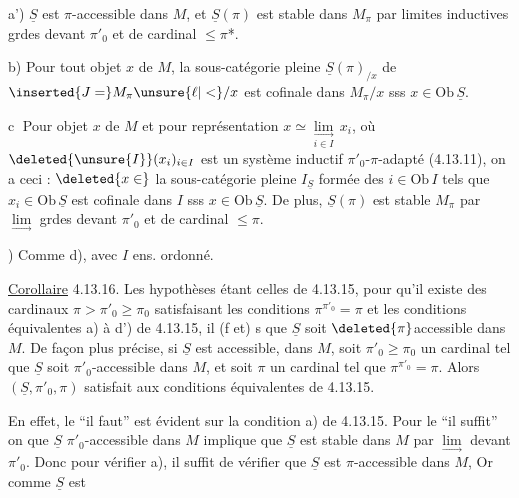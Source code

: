 a') $\underline S$ est $\pi$-accessible dans $M$, et $\underline S(\pi)$ est stable dans $M_\pi$ par limites inductives grdes devant $\pi'_0$ et de cardinal $\leq\pi$*.


b) Pour tout objet $x$ de $M$,  la sous-catégorie  pleine $\underline S(\pi)_{/x}$ de $\inserted{J=}M_{\pi}\unsure{\ell|<}/x$ est cofinale dans $M_\pi/x$ sss $x\in\mathrm{Ob}\,\underline S$. 

\textcircled{c} Pour  objet $x$ de $M$ et pour  représentation $x\simeq\underset{i\in I}{\underset{\longrightarrow}{\lim}}\,x_i$, où $\deleted{\unsure{I}}(x_i)_{i\in I}$ est un système inductif $\pi'_0$-$\pi$-adapté (4.13.11), on a ceci : $\deleted{x\in}$ la sous-catégorie  pleine $I_{\underline S}$  formée des $i\in\mathrm{Ob}\,I$ tels que $x_i\in\mathrm{Ob}\,\underline S$ est cofinale dans $I$ sss $x\in\mathrm{Ob}\,\underline S$. De plus, $\underline S(\pi)$ est stable  $M_\pi$ par $\underset{\longrightarrow}{\lim}$ grdes devant $\pi'_0$ et de cardinal $\leq\pi$.


) Comme d), avec $I$ ens. ordonné.

\uline{Corollaire} 4.13.16. Les hypothèses  étant celles de 4.13.15, pour qu'il existe des cardinaux $\pi>\pi'_0\geq\pi_0$ satisfaisant les conditions $\pi^{\pi'_0}=\pi$  et les conditions équivalentes a) à d') de 4.13.15, il (f et) s que $\underline S$ soit $\deleted{\pi}$accessible dans $M$. De façon plus précise,  si $\underline S$ est accessible, dans $M$, soit $\pi'_0\geq\pi_0$ un cardinal tel que $\underline S$ soit $\pi'_0$-accessible dans $M$, et soit $\pi$ un cardinal  tel que $\pi^{\pi'_0}=\pi$. Alors $(\underline S,\pi'_0,\pi)$ satisfait aux conditions équivalentes de 4.13.15.

En effet, le ``il faut'' est évident sur la condition a) de 4.13.15. Pour le ``il suffit'' on  que $\underline S$ $\pi'_0$-accessible dans $M$ implique que $\underline S$ est stable dans $M$ par $\underset{\longrightarrow}{\lim}$  devant $\pi'_0$. Donc pour vérifier a), il suffit de vérifier que $\underline S$ est $\pi$-accessible dans $M$, Or comme $\underline S$ est


